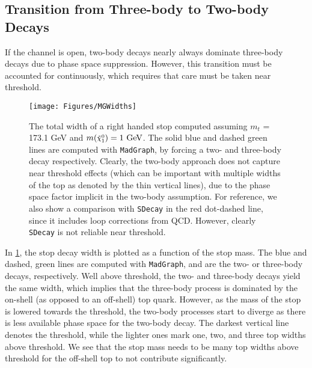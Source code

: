 \documentclass[a4paper,12pt]{article}
\newcommand{\gev}{~\text{GeV}}
\def\mnino{\ensuremath{m({\footnotesize \ninoone})}}
\def\ninoone{\ensuremath{\mathchoice%
      {\displaystyle\raise.4ex\hbox{$\displaystyle\tilde\chi^0_1$}}%
         {\textstyle\raise.1ex\hbox{$\textstyle\tilde\chi^0_1$}}%
       {\scriptstyle\raise.3ex\hbox{$\scriptstyle\tilde\chi^0_1$}}%
 {\scriptscriptstyle\raise.3ex\hbox{$\scriptscriptstyle\tilde\chi^0_1$}}}}
\begin{document}
\subsection{Transition from Three-body to Two-body Decays}
\label{sec:2v3}

If the channel is open, two-body decays nearly always dominate three-body decays due to phase space suppression. However, this transition must be accounted for continuously, which requires that care must be taken near threshold.

\begin{figure}[b]
\begin{center}
\texttt{[image: Figures/MGWidths]}
\caption{The total width of a right handed stop computed assuming $m_t$ = 173.1 GeV and $\mnino =1\gev$.  The solid blue and dashed green lines are computed with \texttt{MadGraph}, by forcing a two- and three-body decay respectively. Clearly, the two-body approach does not capture near threshold effects (which can be important with multiple widths of the top as denoted by the thin vertical lines), due to the phase space factor implicit in the two-body assumption. For reference, we also show a comparison with \texttt{SDecay} in the red dot-dashed line, since it includes loop corrections from QCD. However, clearly \texttt{SDecay} is not reliable near threshold.}
\label{fig:DecayWidths}
\end{center}
\end{figure}

In \cref{fig:DecayWidths}, the stop decay width is plotted as a function of the stop mass. The blue and dashed, green lines are computed with \texttt{MadGraph}, and are the two- or three-body decays, respectively. Well above threshold, the two- and three-body decays yield the same width, which implies that the three-body process is dominated by the on-shell (as opposed to an off-shell) top quark. However, as the mass of the stop is lowered towards the threshold, the two-body processes start to diverge as there is less available phase space for the two-body decay.  The darkest vertical line denotes the threshold, while the lighter ones mark one, two, and three top widths above threshold.  We see that the stop mass needs to be many top widths above threshold for the off-shell top to not contribute significantly.
\end{document}
